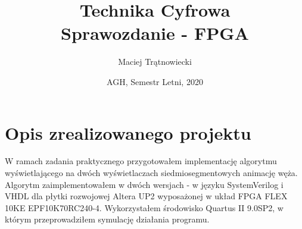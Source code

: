 \documentclass{article}
\title{Technika Cyfrowa\\
Sprawozdanie - FPGA}
\author{Maciej Trątnowiecki}
\date{AGH, Semestr Letni, 2020}
\begin{document}
    \maketitle
    \section{Opis zrealizowanego projektu}
        W ramach zadania praktycznego przygotowałem implementację algorytmu wyświetlającego na dwóch wyświetlaczach siedmiosegmentowych animację węża. Algorytm zaimplementowałem w dwóch wersjach - w języku SystemVerilog i VHDL dla płytki rozwojowej Altera UP2 wyposażonej w układ FPGA FLEX 10KE EPF10K70RC240-4. Wykorzystałem środowisko Quartus II 9.0SP2, w którym przeprowadziłem symulację działania programu. \\
        
\end{document}
